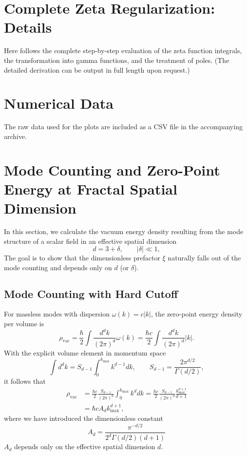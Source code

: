 	\appendix
	\section{Complete Zeta Regularization: Details}
	\label{app:zeta_full}
	
	Here follows the complete step-by-step evaluation of the zeta function integrals, the transformation into gamma functions, and the treatment of poles. (The detailed derivation can be output in full length upon request.)
	
	\section{Numerical Data}
	The raw data used for the plots are included as a CSV file in the accompanying archive.
	
	\section{Mode Counting and Zero-Point Energy at Fractal Spatial Dimension}
	\label{sec:modecounting}
	
	In this section, we calculate the vacuum energy density resulting from the mode structure of a scalar field in an effective spatial dimension
	\[
	d = 3 + \delta,\qquad |\delta|\ll 1,
	\]
	The goal is to show that the dimensionless prefactor \(\xi\) naturally falls out of the mode counting and depends only on \(d\) (or \(\delta\)).
	
	\subsection{Mode Counting with Hard Cutoff}
	For massless modes with dispersion \(\omega(k)=c|k|\), the zero-point energy density per volume is
	\[
	\rho_{\mathrm{vac}} = \frac{\hbar}{2}\int \frac{d^{d}k}{(2\pi)^d}\omega(k)
	= \frac{\hbar c}{2}\int\frac{d^{d}k}{(2\pi)^d}|k|.
	\]
	With the explicit volume element in momentum space
	\[
	\int d^{d}k = S_{d-1}\int_0^{k_{\max}} k^{d-1}dk,
	\qquad
	S_{d-1}=\frac{2\pi^{d/2}}{\Gamma(d/2)},
	\]
	it follows that
	\begin{align}
		\rho_{\mathrm{vac}}
		&= \frac{\hbar c}{2}\frac{S_{d-1}}{(2\pi)^d}\int_0^{k_{\max}} k^{d}dk
		= \frac{\hbar c}{2}\frac{S_{d-1}}{(2\pi)^d}\frac{k_{\max}^{d+1}}{d+1}
		\nonumber\\
		&= \hbar c  A_d  k_{\max}^{d+1},
		\label{eq:rho_Ad}
	\end{align}
	where we have introduced the dimensionless constant
	\[
	\boxed{A_d = \dfrac{\pi^{-d/2}}{2^d\Gamma(d/2)(d+1)}}
	\]
	\(A_d\) depends only on the effective spatial dimension \(d\).
	
